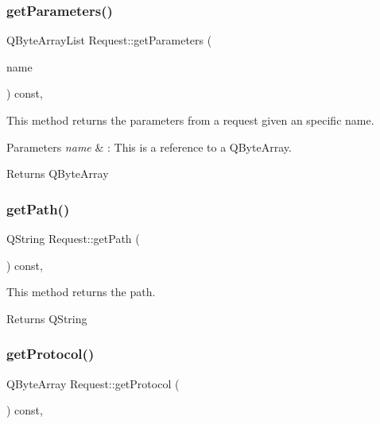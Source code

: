 \subsubsection{\texorpdfstring{get\+Parameters()}{getParameters()}}
{\footnotesize\ttfamily Q\+Byte\+Array\+List Request\+::get\+Parameters (\begin{DoxyParamCaption}\item[{const Q\+Byte\+Array \&}]{name }\end{DoxyParamCaption}) const\hspace{0.3cm}{\ttfamily [inline]}, {\ttfamily [noexcept]}}



This method returns the parameters from a request given an specific name. 


\begin{DoxyParams}{Parameters}
{\em name} & \+: This is a reference to a Q\+Byte\+Array. \\
\hline
\end{DoxyParams}
\begin{DoxyReturn}{Returns}
Q\+Byte\+Array 
\end{DoxyReturn}
\mbox{\label{class_request_ad87c576630126d44838da46c18a90e01}} 
\subsubsection{\texorpdfstring{get\+Path()}{getPath()}}
{\footnotesize\ttfamily Q\+String Request\+::get\+Path (\begin{DoxyParamCaption}{ }\end{DoxyParamCaption}) const\hspace{0.3cm}{\ttfamily [inline]}, {\ttfamily [noexcept]}}



This method returns the path. 

\begin{DoxyReturn}{Returns}
Q\+String 
\end{DoxyReturn}
\mbox{\label{class_request_a975ffb8f0b6aa08879ffecb50d9bb289}} 
\subsubsection{\texorpdfstring{get\+Protocol()}{getProtocol()}}
{\footnotesize\ttfamily Q\+Byte\+Array Request\+::get\+Protocol (\begin{DoxyParamCaption}{ }\end{DoxyParamCaption}) const\hspace{0.3cm}{\ttfamily [inline]}, {\ttfamily [noexcept]}}



